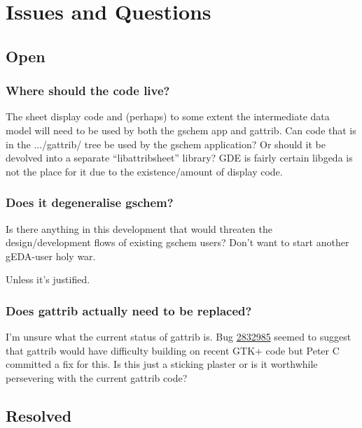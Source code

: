 \documentclass[a4,10pt]{article}
\begin{document}
\section{Issues and Questions}
\subsection{Open}
%
\subsubsection{Where should the code live?}
The sheet display code and (perhaps) to some extent the intermediate
data model will need to be used by both the gschem app and
gattrib. Can code that is in the .../gattrib/ tree be used by the
gschem application? Or should it be devolved into a separate
``libattribsheet'' library? GDE is fairly certain libgeda is not the
place for it due to the existence/amount of display code.
%
\subsubsection{Does it degeneralise gschem?}
Is there anything in this development that would threaten the
design/development flows of existing gschem users? Don't want to start
another gEDA-user holy war.

Unless it's justified.
%
\subsubsection{Does gattrib actually need to be replaced?}
I'm unsure what the current status of gattrib is. Bug
\href{https://sourceforge.net/tracker/?func=detail&atid=818426&aid=2832985&group_id=161080}{2832985}
seemed to suggest that gattrib would have difficulty building on
recent GTK+ code but Peter C committed a fix for this. Is this just a
sticking plaster or is it worthwhile persevering with the current
gattrib code?
%
\subsection{Resolved}
\end{document}
